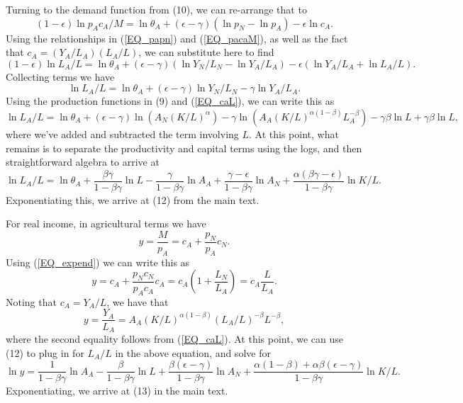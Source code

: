 \documentclass[11pt]{article}
\begin{document}
Turning to the demand function from (10), we can re-arrange that to
\begin{equation}
   (1-\epsilon) \ln p_A c_A/M = \ln \theta_A  + (\epsilon-\gamma)(\ln p_N - \ln p_A) - \epsilon \ln c_A. \nonumber
\end{equation}
Using the relationships in (\ref{EQ_papn}) and (\ref{EQ_pacaM}), as well as the fact that $c_A = (Y_A/L_A)(L_A/L)$, we can substitute here to find
\begin{equation}
    (1-\epsilon)\ln L_A/L = \ln \theta_A + (\epsilon-\gamma)\left(\ln Y_N/L_N - \ln Y_A/L_A \right) - \epsilon \left(\ln Y_A/L_A + \ln L_A/L \right). \nonumber
\end{equation}
Collecting terms we have
\begin{equation}
    \ln L_A/L = \ln \theta_A + (\epsilon-\gamma) \ln Y_N/L_N - \gamma \ln Y_A/L_A. \nonumber
\end{equation}
Using the production functions in (9) and (\ref{EQ_caL}), we can write this as
\begin{equation}
    \ln L_A/L = \ln \theta_A + (\epsilon-\gamma) \ln \left(A_N (K/L)^{\alpha}\right) - \gamma \ln \left(A_A (K/L)^{\alpha(1-\beta)} L_A^{-\beta}\right) - \gamma \beta \ln L + \gamma \beta \ln L, \nonumber
\end{equation}
where we've added and subtracted the term involving $L$. At this point, what remains is to separate the productivity and capital terms using the logs, and then straightforward algebra to arrive at
\begin{equation}
    \ln L_A/L = \ln \theta_A + \frac{\beta\gamma}{1-\beta\gamma} \ln L - \frac{\gamma}{1-\beta\gamma} \ln A_A + \frac{\gamma - \epsilon}{1-\beta\gamma} \ln A_N + \frac{\alpha(\beta\gamma - \epsilon)}{1-\beta\gamma} \ln K/L. \nonumber
\end{equation}
Exponentiating this, we arrive at (12) from the main text.

For real income, in agricultural terms we have
\begin{equation}
    y = \frac{M}{p_A} = c_A + \frac{p_N}{p_A} c_N. \nonumber
\end{equation}
Using (\ref{EQ_expend}) we can write this as
\begin{equation}
    y = c_A + \frac{p_N c_N}{p_A c_A}c_A = c_A \left(1 + \frac{L_N}{L_A}\right) = c_A \frac{L}{L_A}. \nonumber
\end{equation}
Noting that $c_A = Y_A/L$, we have that
\begin{equation}
    y = \frac{Y_A}{L_A} = A_A (K/L)^{\alpha(1-\beta)} (L_A/L)^{-\beta} L^{-\beta}, \nonumber
\end{equation}
where the second equality follows from (\ref{EQ_caL}). At this point, we can use (12) to plug in for $L_A/L$ in the above equation, and solve for 
\begin{equation}
    \ln y = \frac{1}{1-\beta\gamma} \ln A_A - \frac{\beta}{1-\beta\gamma} \ln L + \frac{\beta(\epsilon-\gamma)}{1-\beta\gamma} \ln A_N + \frac{\alpha(1-\beta) + \alpha\beta(\epsilon-\gamma)}{1-\beta\gamma} \ln K/L. \nonumber
\end{equation}
Exponentiating, we arrive at (13) in the main text.
\end{document}
